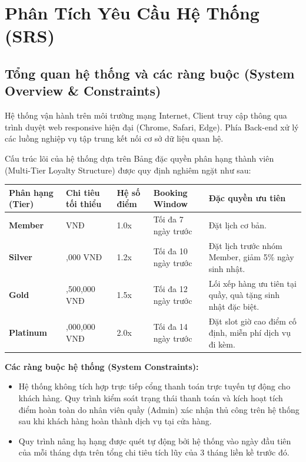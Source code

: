 \chapter{Phân Tích Yêu Cầu Hệ Thống (SRS)}

\section{Tổng quan hệ thống và các ràng buộc (System Overview \& Constraints)}
Hệ thống vận hành trên môi trường mạng Internet, Client truy cập thông qua trình duyệt web responsive hiện đại (Chrome, Safari, Edge). Phía Back-end xử lý các luồng nghiệp vụ tập trung kết nối cơ sở dữ liệu quan hệ.

Cấu trúc lõi của hệ thống dựa trên Bảng đặc quyền phân hạng thành viên (Multi-Tier Loyalty Structure) được quy định nghiêm ngặt như sau:
\begin{longtable}{|>{\centering\arraybackslash}p{2.2cm}|>{\centering\arraybackslash}p{2.3cm}|>{\centering\arraybackslash}p{1.6cm}|>{\centering\arraybackslash}p{2.3cm}|p{4.0cm}|}
\hline
\textbf{Phân hạng (Tier)} & \textbf{Chi tiêu tối thiểu} & \textbf{Hệ số điểm} & \textbf{Booking Window} & \textbf{Đặc quyền ưu tiên} \\ \hline
\textbf{Member} & 0 VNĐ & 1.0x & Tối đa 7 ngày trước & Đặt lịch cơ bản. \\ \hline
\textbf{Silver} & 500,000 VNĐ & 1.2x & Tối đa 10 ngày trước & Đặt lịch trước nhóm Member, giảm 5\% ngày sinh nhật. \\ \hline
\textbf{Gold} & 1,500,000 VNĐ & 1.5x & Tối đa 12 ngày trước & Lối xếp hàng ưu tiên tại quầy, quà tặng sinh nhật đặc biệt. \\ \hline
\textbf{Platinum} & 4,000,000 VNĐ & 2.0x & Tối đa 14 ngày trước & Đặt slot giờ cao điểm cố định, miễn phí dịch vụ đi kèm. \\ \hline
\end{longtable}

\noindent \textbf{Các ràng buộc hệ thống (System Constraints):}
\begin{itemize}
    \item Hệ thống không tích hợp trực tiếp cổng thanh toán trực tuyến tự động cho khách hàng. Quy trình kiểm soát trạng thái thanh toán và kích hoạt tích điểm hoàn toàn do nhân viên quầy (Admin) xác nhận thủ công trên hệ thống sau khi khách hàng hoàn thành dịch vụ tại cửa hàng.
    \item Quy trình nâng hạ hạng được quét tự động bởi hệ thống vào ngày đầu tiên của mỗi tháng dựa trên tổng chi tiêu tích lũy của 3 tháng liền kề trước đó.
\end{itemize}

